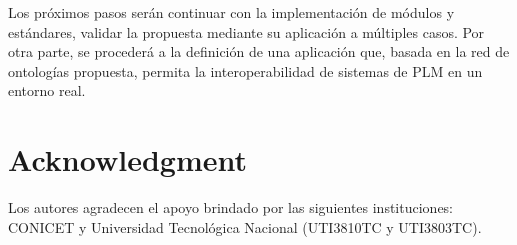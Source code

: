 \documentclass[journal]{IEEEtran}
\begin{document}
Los pr\'oximos pasos ser\'an continuar con la implementaci\'on de m\'odulos y est\'andares, validar la propuesta mediante su aplicaci\'on a m\'ultiples casos. Por otra parte, se proceder\'a a la definici\'on de una aplicaci\'on que, basada en la red de ontolog\'ias propuesta, permita la interoperabilidad de sistemas de PLM en un entorno real.







%


\section*{Acknowledgment}

Los autores agradecen el apoyo brindado por las siguientes instituciones: CONICET y Universidad Tecnol\'ogica Nacional (UTI3810TC y UTI3803TC).


\ifCLASSOPTIONcaptionsoff
  \newpage
\fi



\end{document}
